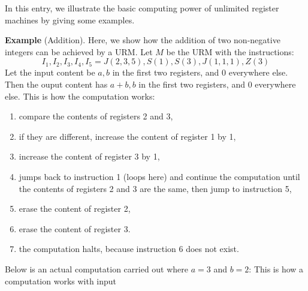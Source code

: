 \documentclass[12pt]{article}
\begin{document}

In this entry, we illustrate the basic computing power of unlimited register machines by giving some examples.

\textbf{Example} (Addition).  Here, we show how the addition of two non-negative integers can be achieved by a URM.  Let $M$ be the URM with the instructions:
$$I_1,I_2,I_3,I_4,I_5=J(2,3,5),S(1),S(3),J(1,1,1),Z(3)$$
Let the input content be $a,b$ in the first two registers, and $0$ everywhere else.  Then the ouput content has $a+b,b$ in the first two registers, and $0$ everywhere else.  This is how the computation works:
\begin{enumerate}
\item compare the contents of registers 2 and 3,
\item if they are different, increase the content of register 1 by 1,
\item increase the content of register 3 by 1,
\item jumps back to instruction 1 (loops here) and continue the computation until the contents of registers 2 and 3 are the same, then jump to instruction 5,
\item erase the content of register 2,
\item erase the content of register 3.
\item the computation halts, because instruction 6 does not exist.
\end{enumerate}
Below is an actual computation carried out where $a=3$ and $b=2$:
This is how a computation works with input 
\end{document}
